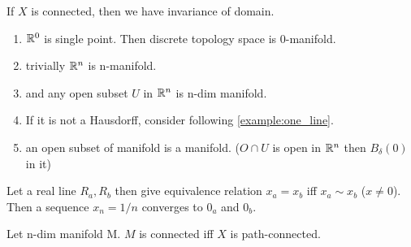 \documentclass{article}
\begin{document}
If $X$ is connected, then we have invariance of domain.

\begin{enumerate}
    \item $\mathbb{R}^0$ is single point. Then discrete topology space is 0-manifold.
    \item trivially $\mathbb{R}^n$ is n-manifold.
    \item and any open subset $U$ in $\mathbb{R}^n$ is n-dim manifold.
    \item If it is not a Hausdorff, consider following \cref{example:one_line}.
    \item an open subset of manifold is a manifold. ($O \cap U$ is open in $\mathbb{R}^n$ then $B_\delta(0)$ in it)
\end{enumerate}

\begin{example}
    \label{example:one_line}
    Let a real line $R_a, R_b$ then give equivalence relation $x_a=x_b$ iff $x_a\sim x_b$ ($x \neq 0$). Then a sequence $x_n = 1/n$ converges to $0_a$ and $0_b$.

\end{example}

\begin{theorem}
    Let n-dim manifold M.
    $M$ is connected iff $X$ is path-connected.
\end{theorem}
\end{document}
